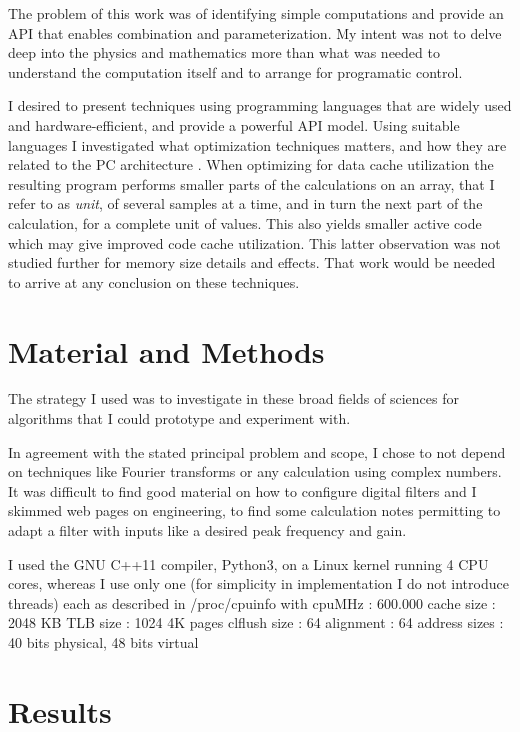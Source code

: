 \documentclass{article}
\begin{document}
The problem of this work was of identifying simple computations and
provide an API that enables combination and parameterization.
My intent was not to delve deep
into the physics and mathematics more than what was needed
to understand the computation itself and to arrange for programatic control.

I desired to present techniques using programming languages that are widely
used and hardware-efficient, and provide a powerful API model.
Using suitable languages I investigated what optimization techniques matters,
and how they are related to the PC architecture \cite{cache}.
When optimizing for data cache utilization the resulting program performs
smaller parts of the calculations on an array, that I refer to as \textit{unit},
of several samples at a time, and in turn the next part of the calculation,
for a complete unit of values.
This also yields smaller active code which may give
improved code cache utilization.
This latter observation was not studied further for memory size details and effects.
That work would be needed to arrive at any conclusion on these techniques.

\section{Material and Methods}

The strategy I used was to investigate in these broad fields of sciences
for algorithms that I could prototype and experiment with.

In agreement with the stated principal problem and scope, I chose to not
depend on techniques like Fourier transforms or any calculation using complex
numbers.
It was difficult to find good material on how to configure digital filters
and I skimmed web pages on engineering, to find some calculation notes
permitting to adapt a filter with inputs like a desired peak frequency
and gain.

I used the GNU C++11 compiler, Python3, on a Linux kernel running 4 CPU
cores, whereas I use only one (for simplicity in implementation I do not
introduce threads) each as described in /proc/cpuinfo with  cpuMHz : 600.000
cache size : 2048 KB TLB size : 1024 4K pages clflush size : 64 alignment
: 64 address sizes : 40 bits physical, 48 bits virtual

\section{Results}
\end{document}
